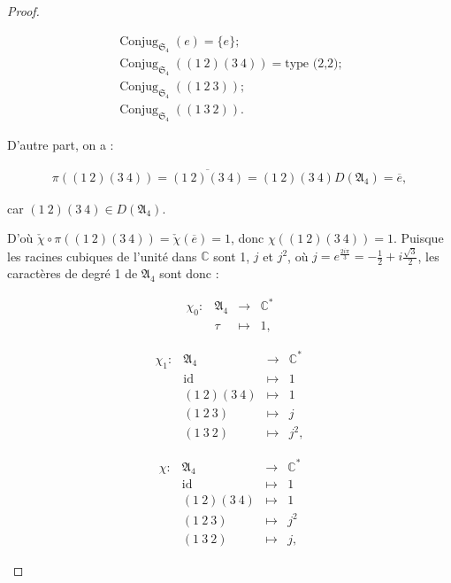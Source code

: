 \documentclass[french]{book}
\theoremstyle{definition}
\begin{document}
\begin{proof}
\begin{enumerate}
\begin{enumerate}
      \begin{gather*}
        \operatorname{Conjug}_{\mathfrak{S}_{4}}(e) = \{ e \} ; \\
        \operatorname{Conjug}_{\mathfrak{S}_{4}}((1 \ 2)(3 \ 4)) = \text{type (2,2)} ; \\
        \operatorname{Conjug}_{\mathfrak{S}_{4}}((1 \ 2 \ 3)) ; \\
        \operatorname{Conjug}_{\mathfrak{S}_{4}}((1 \ 3 \ 2)).
      \end{gather*}

      D'autre part, on a :

      \begin{gather*}
        \pi((1 \ 2)(3 \ 4)) = \overline{(1 \ 2)(3 \ 4)} = (1 \ 2)(3 \ 4)D(\mathfrak{A}_{4}) = \overline{e},
      \end{gather*}

      car \((1 \ 2)(3 \ 4) \in D(\mathfrak{A}_{4})\).

      D'où \(\check{\chi} \circ \pi((1 \ 2)(3 \ 4)) = \check{\chi}(\overline{e}) = 1\), donc \(\chi((1 \ 2)(3 \ 4)) = 1\).
      Puisque les racines cubiques de l'unité dans \(\mathbb{C}\) sont 1, \(j\) et \(j^2\), où \(j = e^{\frac{2 i \pi}{3}} = - \frac{1}{2} + i \frac{\sqrt{3}}{2}\), les caractères de degré 1 de \(\mathfrak{A}_{4}\) sont donc :

      \[\begin{matrix}
      \chi_0 : & \mathfrak{A}_{4} & \longrightarrow & \mathbb{C}^{*} \\
      \ & \tau & \longmapsto & 1,
      \end{matrix}\]

      \[\begin{matrix}
      \chi_1 : & \mathfrak{A}_{4} & \longrightarrow & \mathbb{C}^{*} \\
      \ & \operatorname{id} & \longmapsto & 1 \\
      \ & (1 \ 2)(3 \ 4) & \longmapsto & 1 \\
      \ & (1 \ 2 \ 3) & \longmapsto & j \\
      \ & (1 \ 3 \ 2) & \longmapsto & j^2,
      \end{matrix}\]

      \[\begin{matrix}
      \chi : & \mathfrak{A}_{4} & \longrightarrow & \mathbb{C}^{*} \\
      \ & \operatorname{id} & \longmapsto & 1 \\
      \ & (1 \ 2)(3 \ 4) & \longmapsto & 1 \\
      \ & (1 \ 2 \ 3) & \longmapsto & j ^2 \\
      \ & (1 \ 3 \ 2) & \longmapsto & j,
      \end{matrix}\]


\end{enumerate}
\end{enumerate}
\end{proof}
\end{document}
